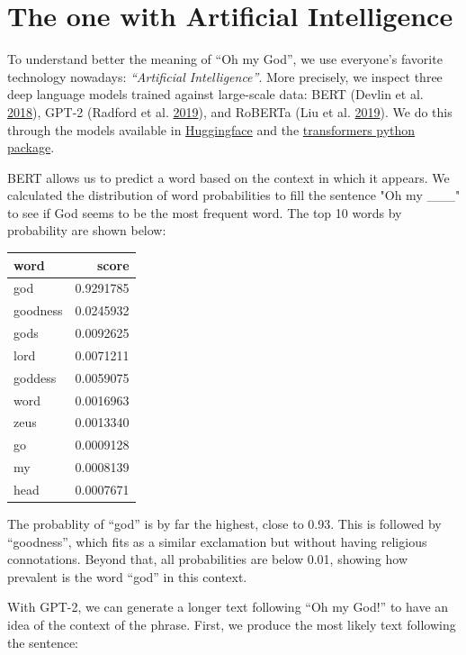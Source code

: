 \documentclass[]{article}
\begin{document}
\hypertarget{the-one-with-artificial-intelligence}{%
\section{The one with Artificial Intelligence}\label{the-one-with-artificial-intelligence}}

To understand better the meaning of ``Oh my God'', we use everyone's favorite technology nowadays: \emph{``Artificial Intelligence''}. More precisely, we inspect three deep language models trained against large-scale data: BERT (Devlin et al. \protect\hyperlink{ref-devlin2018bert}{2018}), GPT-2 (Radford et al. \protect\hyperlink{ref-radford2019language}{2019}), and RoBERTa (Liu et al. \protect\hyperlink{ref-liu2019roberta}{2019}). We do this through the models available in \href{https://huggingface.co/}{Huggingface} and the \href{https://pypi.org/project/transformers/}{transformers python package}.

BERT allows us to predict a word based on the context in which it appears. We calculated the distribution of word probabilities to fill the sentence "Oh my \_\_\_" to see if God seems to be the most frequent word. The top 10 words by probability are shown below:

\begin{tabular}{l|r}
\hline
word & score\\
\hline
god & 0.9291785\\
\hline
goodness & 0.0245932\\
\hline
gods & 0.0092625\\
\hline
lord & 0.0071211\\
\hline
goddess & 0.0059075\\
\hline
word & 0.0016963\\
\hline
zeus & 0.0013340\\
\hline
go & 0.0009128\\
\hline
my & 0.0008139\\
\hline
head & 0.0007671\\
\hline
\end{tabular}

The probablity of ``god'' is by far the highest, close to 0.93. This is followed by ``goodness'', which fits as a similar exclamation but without having religious connotations. Beyond that, all probabilities are below 0.01, showing how prevalent is the word ``god'' in this context.

With GPT-2, we can generate a longer text following ``Oh my God!'' to have an idea of the context of the phrase. First, we produce the most likely text following the sentence:
\end{document}
